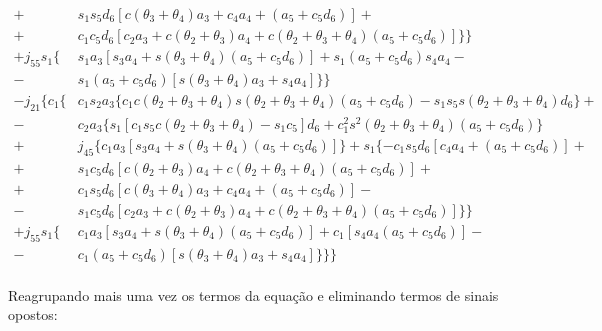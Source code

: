 \begin{align*}
                                           +&s_1s_5d_6[c(\theta_3+\theta_4)a_3 + c_4a_4 + (a_5+c_5d_6)]+\\
                                           +&c_1c_5d_6[c_2a_3+c(\theta_2+\theta_3)a_4+c(\theta_2+\theta_3+\theta_4)(a_5+c_5d_6)]\}\} \\
                                +j_{55}s_1\{&s_1a_3[s_3a_4+s(\theta_3+\theta_4)(a_5+c_5d_6)]+s_1(a_5+c_5d_6)s_4a_4-\\
                                           -&s_1(a_5+c_5d_6)[s(\theta_3+\theta_4)a_3 + s_4a_4]\}\} \\
                               -j_{21}\{c_1\{&c_1s_2a_3\{c_1c(\theta_2+\theta_3+\theta_4)s(\theta_2+\theta_3+\theta_4)(a_5+c_5d_6) - s_1s_5s(\theta_2+\theta_3+\theta_4)d_6\}+\\
                                           -&c_2a_3\{s_1[c_1s_5c(\theta_2+\theta_3+\theta_4) - s_1c_5]d_6 + c_1^2s^2(\theta_2+\theta_3+\theta_4)(a_5+c_5d_6)\} \\
                                           +&j_{45}\{c_1a_3[s_3a_4+s(\theta_3+\theta_4)(a_5+c_5d_6)]\} + s_1\{-c_1s_5d_6[c_4a_4+(a_5+c_5d_6)] +\\
                                           +&s_1c_5d_6[c(\theta_2+\theta_3)a_4+c(\theta_2+\theta_3+\theta_4)(a_5+c_5d_6)] + \\
                                           +&c_1s_5d_6[c(\theta_3+\theta_4)a_3+c_4a_4+(a_5+c_5d_6)] -\\
                                           -&s_1c_5d_6[c_2a_3+c(\theta_2+\theta_3)a_4+c(\theta_2+\theta_3+\theta_4)(a_5+c_5d_6)]\}\} \\
                                +j_{55}s_1\{&c_1a_3[s_3a_4+s(\theta_3+\theta_4)(a_5+c_5d_6)]+c_1[s_4a_4(a_5+c_5d_6)]-\\
                                           -&c_1(a_5+c_5d_6)[s(\theta_3+\theta_4)a_3+s_4a_4]\}\}\} \\            
\end{align*}

Reagrupando mais uma vez os termos da equação e eliminando termos de sinais opostos:

